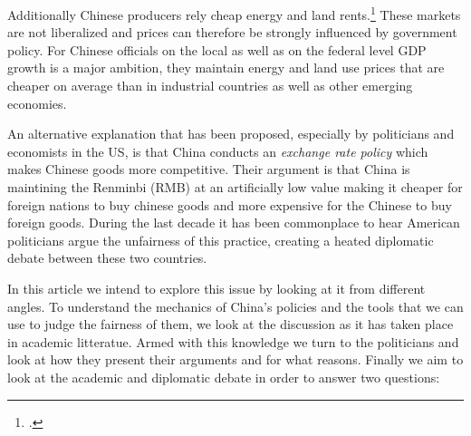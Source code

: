 Additionally Chinese producers rely cheap energy and land 
rents.\footnote{\cite[pp.  25]{Huang2010}.} These markets are not 
liberalized and prices can therefore be strongly influenced by 
government policy. For Chinese officials on the local as well as on the 
federal level GDP growth is a major ambition, they maintain energy and 
land use prices that are cheaper on average than in industrial countries 
as well as other emerging economies.



An alternative explanation that has been proposed, especially by 
politicians and economists in the US, is that China conducts an 
\emph{exchange rate policy} which makes Chinese goods more competitive.
Their argument is that China is maintining the Renminbi (RMB) at an 
artificially low value making it cheaper for foreign nations to buy 
chinese goods and more expensive for the Chinese to buy foreign goods.  
During the last decade it has been commonplace to hear American 
politicians argue the unfairness of this practice, creating a heated 
diplomatic debate between these two countries.

In this article we intend to explore this issue by looking at it from 
different angles. To understand the mechanics of China's policies and 
the tools that we can use to judge the fairness of them, we look at the 
discussion as it has taken place in academic litteratue. Armed with this 
knowledge we turn to the politicians and look at how they present their 
arguments and for what reasons. Finally we aim to look at the academic 
and diplomatic debate in order to answer two questions:

